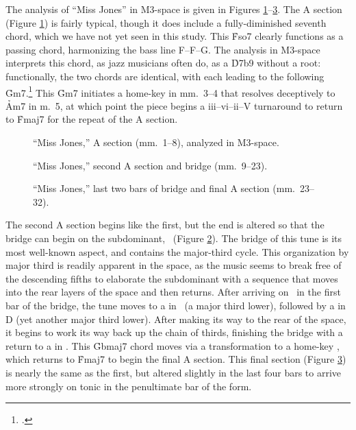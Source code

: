 The analysis of ``Miss Jones'' in M3-space is given in Figures
\ref{maj3:miss-jones-a}--\ref{maj3:miss-jones-c}. The A section (Figure
\ref{maj3:miss-jones-a}) is fairly typical, though it does include a
fully-diminished seventh chord, which we have not yet seen in this study. This
\h{Fso7} clearly functions as a passing chord, harmonizing the bass line
F--F\sharp--G. The analysis in M3-space interprets this chord, as jazz
musicians often do, as a \h{D7b9} without a root: functionally, the two chords
are identical, with each leading to the following \h{Gm7}.\footcite[85]{levine:1995} This
\h{Gm7} initiates a home-key \tf in mm.~3--4 that resolves deceptively to
\h{Am7} in m.~5, at which point the piece begins a iii--vi--ii--V turnaround
to return to \h{Fmaj7} for the repeat of the A section.

\begin{figure}[tbp]
  \ContinuedFloat
  \caption{``Miss Jones,'' A section (mm.~1--8), analyzed in M3-space.}
\label{maj3:miss-jones-a}
\end{figure}

\begin{figure}[tbp]
  \ContinuedFloat
  \caption{``Miss Jones,'' second A section and bridge (mm.~9--23).}
\label{maj3:miss-jones-b}
\end{figure}

\begin{figure}[tbp]
  \ContinuedFloat
  \caption{``Miss Jones,'' last two bars of bridge and final A section
    (mm.~23--32).}
\label{maj3:miss-jones-c}
\end{figure}

The second A section begins like the first, but the end is altered so that the
bridge can begin on the subdominant, \Bflat\ (Figure \ref{maj3:miss-jones-b}).
The bridge of this tune is its most well-known aspect, and contains the
major-third cycle. This organization by major third is readily apparent in
the space, as the music seems to break free of the descending fifths to
elaborate the subdominant with a sequence that moves into the rear layers of
the space and then returns. After arriving on \Bflat\ in the first bar of the
bridge, the tune moves to a \tfo in \Gflat\ (a major third lower), followed by
a \tfo in D (yet another major third lower). After making its way to the rear
of the space, it begins to work its way back up the chain of thirds, finishing
the bridge with a return to a \tfo in \Gflat. This \h{Gbmaj7} chord moves via a
\slideS transformation to a home-key \tfo, which returns to \h{Fmaj7} to begin
the final A section. This final section (Figure \ref{maj3:miss-jones-c}) is
nearly the same as the first, but altered slightly in the last four bars to
arrive more strongly on tonic in the penultimate bar of the form.

